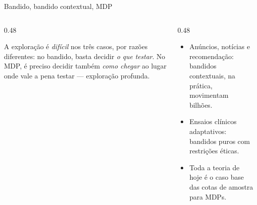 \documentclass[aspectratio=169, 10pt]{beamer}
\begin{document}
\begin{frame}{Bandido, bandido contextual, MDP}
  \centering

  \vspace{1em}
  \begin{columns}[T]
    \begin{column}{0.48\textwidth}
      \begin{ideiabox}
        A exploração é \emph{difícil} nos três casos, por razões diferentes:
        no bandido, basta decidir \emph{o que testar}. No MDP, é preciso
        decidir também \emph{como chegar} ao lugar onde vale a pena testar
        --- exploração profunda.
      \end{ideiabox}
    \end{column}
    \begin{column}{0.48\textwidth}
      \begin{itemize}
        \item Anúncios, notícias e recomendação: bandidos contextuais, na
              prática, movimentam bilhões.
        \item Ensaios clínicos adaptativos: bandidos puros com
              restrições éticas.
        \item Toda a teoria de hoje é o caso base das cotas de amostra
              para MDPs.
      \end{itemize}
    \end{column}
  \end{columns}
\end{frame}
\end{document}

